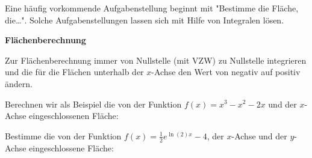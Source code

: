 Eine häufig vorkommende Aufgabenstellung beginnt mit "Bestimme die Fläche, die\dots". Solche Aufgabenstellungen lassen sich mit Hilfe von Integralen lösen.
\begin{tcolorbox}[height=4cm]
	\textbf{Flächenberechnung}

	\textcolor{loestc}{Zur Flächenberechnung immer von Nullstelle (mit VZW) zu Nullstelle integrieren und die für die Flächen unterhalb der \(x\)-Achse den Wert von negativ auf positiv ändern.}
\end{tcolorbox}
Berechnen wir als Beispiel die von der Funktion \(f(x)=x^3-x^2-2x\) und der \(x\)-Achse eingeschlossenen Fläche:

\bigskip

\begin{minipage}{\textwidth}
\end{minipage}

\bigskip

Bestimme die von der Funktion  \(f(x)=\frac{1}{2}e^{\ln(2)x}-4\), der \(x\)-Achse und der \(y\)-Achse eingeschlossene Fläche:

\bigskip

